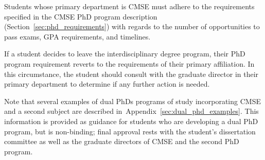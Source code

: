 Students whose primary department is CMSE must adhere to the
requirements specified in the CMSE PhD program description
(Section~\ref{sec:phd_requirements}) with regards to the number of
opportunities to pass exams, GPA requirements, and timelines.

If a student decides to leave the interdisciplinary degree program,
their PhD program requirement reverts to the requirements of their
primary affiliation.  In this circumstance, the student should consult
with the graduate director in their primary department to determine if
any further action is needed.

Note that several examples of dual PhDs programs of study
incorporating CMSE and a second subject are described
in~Appendix~\ref{sec:dual_phd_examples}.  This information is provided
as guidance for students who are developing a dual PhD program, but
is non-binding; final approval rests with the student's dissertation
committee as well as the graduate directors of CMSE and the second PhD
program.
